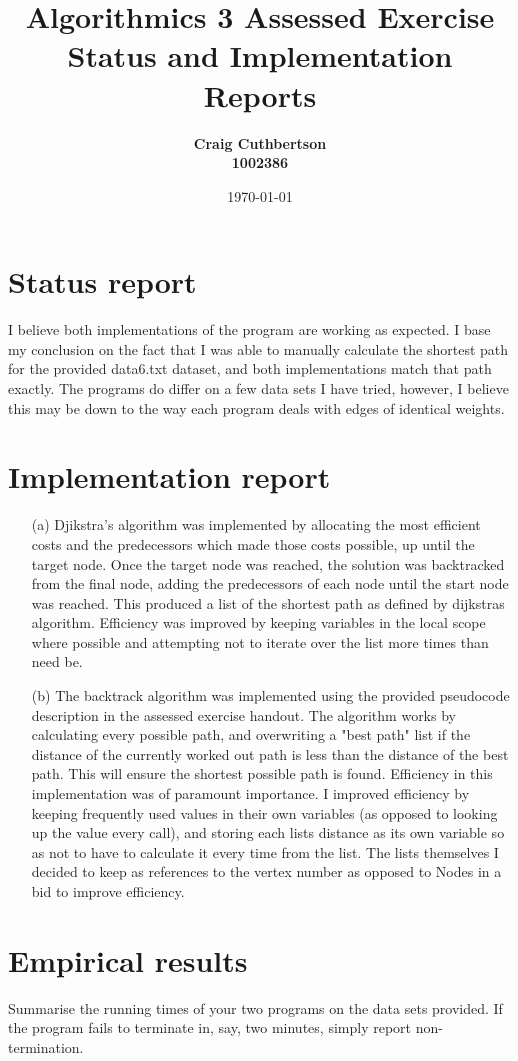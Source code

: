 \documentclass{article}
\title{Algorithmics 3 Assessed Exercise\\ \vspace{4mm} 
Status and Implementation Reports}
\author{\bf Craig Cuthbertson\\ \bf 1002386}
\date{\today}
\begin{document}
\maketitle

\section*{Status report}

I believe both implementations of the program are working as expected. I base my conclusion on the fact that I was able to manually calculate the shortest path for the provided data6.txt dataset, and both implementations match that path exactly. The programs do differ on a few data sets I have tried, however, I believe this may be down to the way each program deals with edges of identical weights.

\section*{Implementation report}

\begin{itemize}
\item[(a)] 
Djikstra's algorithm was implemented by allocating the most efficient costs and the predecessors which made those costs possible, up until the target node. Once the target node was reached, the solution was backtracked from the final node, adding the predecessors of each node until the start node was reached. This produced a list of the shortest path as defined by dijkstras algorithm. Efficiency was improved by keeping variables in the local scope where possible and attempting not to iterate over the list more times than need be. 
\item[(b)]
The backtrack algorithm was implemented using the provided pseudocode description in the assessed exercise handout. The algorithm works by calculating every possible path, and overwriting a "best path" list if the distance of the currently worked out path is less than the distance of the best path. This will ensure the shortest possible path is found. Efficiency in this implementation was of paramount importance. I improved efficiency by keeping frequently used values in their own variables (as opposed to looking up the value every call), and storing each lists distance as its own variable so as not to have to calculate it every time from the list. The lists themselves I decided to keep as references to the vertex number as opposed to Nodes in a bid to improve efficiency.
\end{itemize}

\section*{Empirical results}

Summarise the running times of your two programs on the data sets provided. If the program fails to terminate in, say, two minutes, simply report non-termination. 
\end{document}
